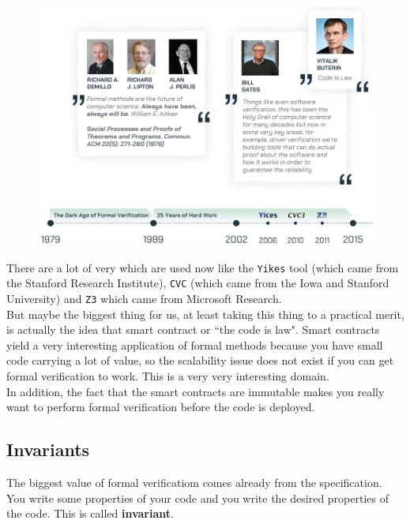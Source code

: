 \documentclass[oneside]{book}
\begin{document}
    \begin{figure}[htbp!]
        \centering
        \includegraphics[width=\linewidth]{img/formal_verification_history_2}
    \end{figure}

    There are a lot of very which are used now like the \texttt{Yikes} tool (which came from the Stanford Research Institute), \texttt{CVC} (which came from the Iowa and Stanford University) and \texttt{Z3} which came from Microsoft Research.\\

    But maybe the biggest thing for us, at least taking this thing to a practical merit, is actually the idea that smart contract or ``the code is law".
    Smart contracts yield a very interesting application of formal methods because you have small code carrying a lot of value, so the scalability issue does not exist if you can get formal verification to work.
    This is a very very interesting domain.\\

    In addition, the fact that the smart contracts are immutable makes you really want to perform formal verification before the code is deployed.

    \subsection{Invariants}

    The biggest value of formal verificatiom comes already from the specification.
    You write some properties of your code and you write the desired properties of the code.
    This is called \textbf{invariant}.
\end{document}
